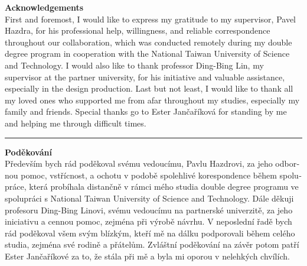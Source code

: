 \clearpage
\vspace*{\fill}
\noindent\textbf{Acknowledgements}\\[0.25cm]
First and foremost, I would like to express my gratitude to my supervisor, \foreignlanguage{czech}{Pavel Hazdra}, for his professional help, willingness, and reliable correspondence throughout our collaboration, which was conducted remotely during my double degree program in cooperation with the National Taiwan University of Science and Technology. I would also like to thank professor Ding-Bing Lin, my supervisor at the partner university, for his initiative and valuable assistance, especially in the design production. Last but not least, I would like to thank all my loved ones who supported me from afar throughout my studies, especially my family and friends. Special thanks go to \foreignlanguage{czech}{Ester Jančaříková} for standing by me and helping me through difficult times.\\
\hrule\vspace*{1cm}
\begin{otherlanguage}{czech}
    \noindent\textbf{Poděkování}\\[0.25cm]
    Především bych rád poděkoval svému vedoucímu, Pavlu Hazdrovi, za jeho odbornou pomoc, vstřícnost, a ochotu v podobě spolehlivé korespondence během spolupráce, která probíhala distančně v rámci mého studia double degree programu ve spolupráci s National Taiwan University of Science and Technology. Dále děkuji profesoru Ding-Bing Linovi, svému vedoucímu na partnerské univerzitě, za jeho iniciativu a cennou pomoc, zejména při výrobě návrhu. V neposlední řadě bych rád poděkoval všem svým blízkým, kteří mě na dálku podporovali během celého studia, zejména své rodině a přátelům. Zvláštní poděkování na závěr potom patří Ester Jančaříkové za to, že stála při mě a byla mi oporou v nelehkých chvílích.
\end{otherlanguage}
\clearpage